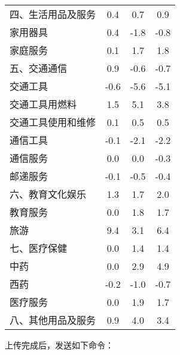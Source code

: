 \begin{table}[h]
\begin{tabular}{lccc}
        \midrule
        四、生活用品及服务 & 0.4 & 0.7 & 0.9 \\
        家用器具 & 0.4 & -1.8 & -0.8 \\
        家庭服务 & 0.1 & 1.7 & 1.8 \\
        \midrule
        五、交通通信 & 0.9 & -0.6 & -0.7 \\
        交通工具 & -0.6 & -5.6 & -5.1 \\
        交通工具用燃料 & 1.5 & 5.1 & 3.8 \\
        交通工具使用和维修 & 0.1 & 0.5 & 0.5 \\
        通信工具 & -0.1 & -2.1 & -2.2 \\
        通信服务 & 0.0 & 0.0 & -0.3 \\
        邮递服务 & -0.1 & -0.5 & -0.4 \\
        \midrule
        六、教育文化娱乐 & 1.3 & 1.7 & 2.0 \\
        教育服务 & 0.0 & 1.8 & 1.7 \\
        旅游 & 9.4 & 3.1 & 6.4 \\
        \midrule
        七、医疗保健 & 0.0 & 1.4 & 1.4 \\
        中药 & 0.0 & 2.9 & 4.9 \\
        西药 & -0.2 & -1.0 & -0.7 \\
        医疗服务 & 0.0 & 1.9 & 1.7 \\
        \midrule
        八、其他用品及服务 & 0.9 & 4.0 & 3.4 \\
        \bottomrule
    \end{tabular}
\end{table}

\FloatBarrier

上传完成后，发送如下命令：


